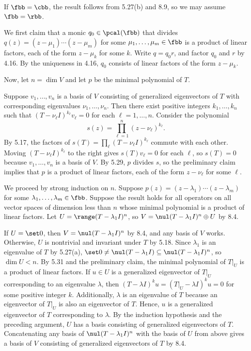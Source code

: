 \begin{sol}
    If $\fbb = \cbb$, the result follows from 5.27(b) and 8.9, so we may assume $\fbb = \rbb$.

    We first claim that a monic $q_0 \in \pcal(\fbb)$ that divides $q(z) = (z - \mu_1) \cdots (z - \mu_m)$ for some $\mu_1, \ldots, \mu_m \in \fbb$ is a product of linear factors, each of the form $z - \mu_k$ for some $k$.
    Write $q = q_0r$, and factor $q_0$ and $r$ by 4.16. By the uniqueness in 4.16, $q_0$ consists of linear factors of the form $z - \mu_k$.
    
    Now, let $n = \dim V$ and let $p$ be the minimal polynomial of $T$.

    \rightimp Suppose $v_1, \ldots, v_n$ is a basis of $V$ consisting of generalized eigenvectors of $T$ with corresponding eigenvalues $\nu_1, \ldots, \nu_n$.
    Then there exist positive integers $k_1, \ldots, k_n$ such that $(T - \nu_\ell I)^{k_\ell} v_\ell = 0$ for each $\ell = 1, \ldots, n$.
    Consider the polynomial
    \[
        s(z) = \prod_{\ell=1}^n (z - \nu_\ell)^{k_\ell}.
    \]
    By 5.17, the factors of $s(T) = \prod_{\ell} (T - \nu_\ell I)^{k_\ell}$ commute with each other.
    Moving $(T - \nu_\ell I)^{k_\ell}$ to the right gives $s(T) v_\ell = 0$ for each $\ell$, so $s(T) = 0$ because $v_1, \ldots, v_n$ is a basis of $V$.
    By 5.29, $p$ divides $s$, so the preliminary claim implies that $p$ is a product of linear factors, each of the form $z - \nu_\ell$ for some $\ell$.

    \leftimp We proceed by strong induction on $n$.
    Suppose $p(z) = (z - \lambda_1) \cdots (z - \lambda_m)$ for some $\lambda_1, \ldots, \lambda_m \in \fbb$.
    Suppose the result holds for all operators on all vector spaces of dimension less than $n$ whose minimal polynomial is a product of linear factors.
    Let $U = \range(T - \lambda_1 I)^n$, so $V = \nul(T - \lambda_1 I)^n \oplus U$ by 8.4.
    
    If $U = \set 0$, then $V = \nul(T - \lambda_1 I)^n$ by 8.4, and any basis of $V$ works.
    Otherwise, $U$ is nontrivial and invariant under $T$ by 5.18.
    Since $\lambda_1$ is an eigenvalue of $T$ by 5.27(a), $\set 0 \neq \nul(T - \lambda_1 I) \subseteq \nul(T - \lambda_1 I)^n$, so $\dim U < n$.
    By 5.31 and the preliminary claim, the minimal polynomial of $T|_U$ is a product of linear factors.
    If $u \in U$ is a generalized eigenvector of $T|_U$ corresponding to an eigenvalue $\lambda$, then $(T - \lambda I)^k u = (T|_U - \lambda I)^k u = 0$ for some positive integer $k$.
    Additionally, $\lambda$ is an eigenvalue of $T$ because an eigenvector of $T|_U$ is also an eigenvector of $T$.
    Hence, $u$ is a generalized eigenvector of $T$ corresponding to $\lambda$.
    By the induction hypothesis and the preceding argument, $U$ has a basis consisting of generalized eigenvectors of $T$.
    Concatenating any basis of $\nul(T - \lambda_1 I)^n$ with the basis of $U$ from above gives a basis of $V$ consisting of generalized eigenvectors of $T$ by 8.4.
\end{sol}

